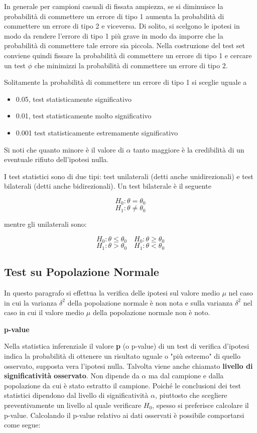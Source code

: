 In generale per campioni casuali di fissata ampiezza, se si diminuisce la probabilità di commettere un errore di tipo 1 aumenta la probabilità di commettere un errore di tipo 2 e viceversa. Di solito, si scelgono le ipotesi in modo da rendere l'errore di tipo 1 più grave in modo da imporre che la probabilità di commettere tale errore sia piccola. Nella costruzione del test set conviene quindi fissare la probabilità di commettere un errore di tipo 1 e cercare un test $\phi$ che minimizzi la probabilità di commettere un errore di tipo 2.

Solitamente la probabilità di commettere un errore di tipo 1 si sceglie uguale a 

\begin{itemize}
    \item 0.05, test statisticamente significativo
    \item 0.01, test statisticamente molto significativo
    \item 0.001 test statisticamente estremamente significativo
\end{itemize}

Si noti che quanto minore è il valore di $\alpha$ tanto maggiore è la credibilità di un eventuale rifiuto dell'ipotesi nulla.

I test statistici sono di due tipi: test unilaterali (detti anche unidirezionali) e test bilaterali (detti anche bidirezionali). Un test bilaterale è il seguente

\[H_0:\theta=\theta_0\]
\[H_1:\theta \neq \theta_0\]

mentre gli unilaterali sono:

\[H_0:\theta \leq \theta_0 \quad H_0:\theta \geq \theta_0\]
\[H_1:\theta > \theta_0 \quad H_1:\theta < \theta_0\]

\subsection{Test su Popolazione Normale}

In questo paragrafo si effettua la verifica delle ipotesi sul valore medio $\mu$ nel caso in cui la varianza $\delta^2$ della popolazione normale è non nota e sulla varianza $\delta^2$ nel caso in cui il valore medio $\mu$ della popolazione normale non è noto.

\vspace{5mm}
\noindent \textbf{p-value}

Nella statistica inferenziale il valore \textbf{p} (o p-value) di un test di verifica d'ipotesi indica la probabilità di ottenere un risultato uguale o "più estremo" di quello osservato, supposta vera l'ipotesi nulla. Talvolta viene anche chiamato \textbf{livello di significatività osservato}. Non dipende da $\alpha$ ma dal campione e dalla popolazione da cui è stato estratto il campione. Poiché le conclusioni dei test statistici dipendono dal livello di significatività $\alpha$, piuttosto che scegliere preventivamente un livello al quale verificare $H_0$, spesso si preferisce calcolare il p-value. Calcolando il p-value relativo ai dati osservati è possibile comportarsi come segue:

